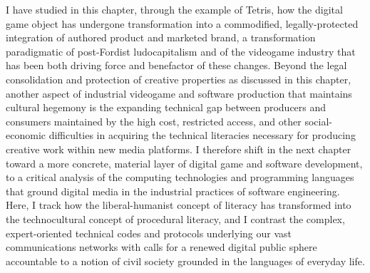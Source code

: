 I have studied in this chapter, through the example of Tetris, how the digital game object has undergone transformation into a commodified, legally-protected integration of authored product and marketed brand, a transformation paradigmatic of post-Fordist ludocapitalism and of the videogame industry that has been both driving force and benefactor of these changes. Beyond the legal consolidation and protection of creative properties as discussed in this chapter, another aspect of industrial videogame and software production that maintains cultural hegemony is the expanding technical gap between producers and consumers maintained by the high cost, restricted access, and other social-economic difficulties in acquiring the technical literacies necessary for producing creative work within new media platforms. I therefore shift in the next chapter toward a more concrete, material layer of digital game and software development, to a critical analysis of the computing technologies and programming languages that ground digital media in the industrial practices of software engineering. Here, I track how the liberal-humanist concept of literacy has transformed into the technocultural concept of procedural literacy, and I contrast the complex, expert-oriented technical codes and protocols underlying our vast communications networks with calls for a renewed digital public sphere accountable to a notion of civil society grounded in the languages of everyday life.